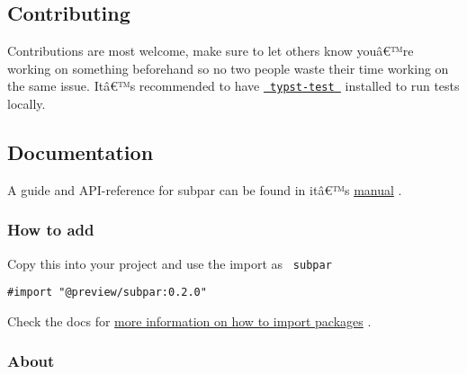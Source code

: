 
\subsection{Contributing}\label{contributing}

Contributions are most welcome, make sure to let others know youâ€™re
working on something beforehand so no two people waste their time
working on the same issue. Itâ€™s recommended to have
\href{https://github.com/tingerrr/typst-test}{\texttt{\ typst-test\ }}
installed to run tests locally.

\subsection{Documentation}\label{documentation}

A guide and API-reference for subpar can be found in itâ€™s
\href{https://github.com/typst/packages/raw/main/packages/preview/subpar/0.2.0/doc/manual.pdf}{manual}
.

\subsubsection{How to add}\label{how-to-add}

Copy this into your project and use the import as \texttt{\ subpar\ }

\begin{verbatim}
#import "@preview/subpar:0.2.0"
\end{verbatim}



Check the docs for
\href{https://typst.app/docs/reference/scripting/\#packages}{more
information on how to import packages} .

\subsubsection{About}\label{about}

